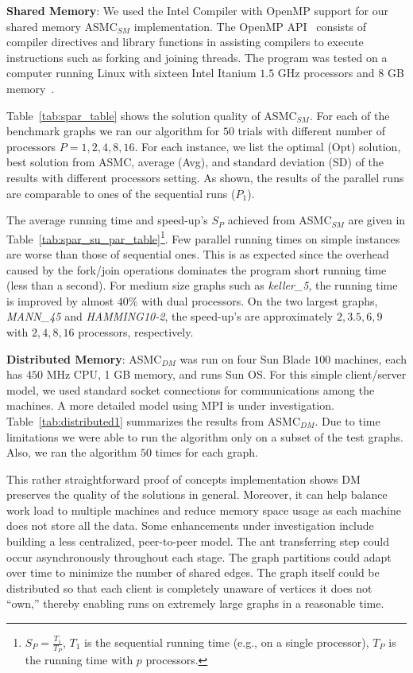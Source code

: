 \documentclass[11pt]{article}
\begin{document}
\textbf{Shared Memory}: We used the Intel Compiler with OpenMP support for our shared memory ASMC$_{SM}$ implementation. The OpenMP API~\cite{OpenMP} consists of compiler directives and library functions in assisting compilers to execute instructions such as forking and joining threads.  The program was tested on a computer running Linux with sixteen Intel Itanium $1.5$ GHz processors and $8$ GB memory~\cite{HPTestDrive}.


Table~\ref{tab:spar_table} shows the solution quality of ASMC$_{SM}$. For each of the benchmark graphs we ran our algorithm for $50$ trials with different number of processors $P=1,2,4,8,16$.  For each instance, we list the optimal (Opt) solution, best solution from ASMC, average (Avg), and standard deviation (SD) of the results with different processors setting.  As shown, the results of the parallel runs are comparable to ones of the sequential runs ($P_1$).

The average running time and speed-up's $S_P$ achieved from ASMC$_{SM}$ are given in Table~\ref{tab:spar_su_par_table}\footnote{$S_P = \frac{T_1}{T_P}$, $T_1$ is the sequential running time (e.g., on a single processor), $T_P$ is the running time with $p$ processors.}.  Few parallel running times on simple instances are worse than those of sequential ones. This is as expected since the overhead caused by the fork/join operations dominates the program short running time (less than a second). For medium size graphs such as \textit{keller\_5},  the running time is improved by almost $40\%$ with dual processors.  On the two largest graphs, \textit{MANN\_45} and \textit{HAMMING10-2}, the speed-up's are approximately $2, 3.5, 6, 9$ with $2,4,8,16$ processors, respectively.  %


\textbf{Distributed Memory}:  ASMC$_{DM}$ was run on four Sun Blade $100$ machines, each has $450$ MHz CPU, 1 GB memory, and runs Sun OS.  For this simple client/server model, we used standard socket connections for communications among the machines.  A more detailed model using MPI is under investigation.   Table~\ref{tab:distributed1} summarizes the results from ASMC$_{DM}$. Due to time limitations we were able to run the algorithm only on a subset of the test graphs.  Also, we ran the algorithm $50$ times for each graph.


This rather straightforward proof of concepts implementation shows DM preserves the quality of the solutions in general. Moreover, it can help  balance work load to multiple machines and reduce memory space usage as each machine does not store all the data. Some enhancements under investigation include building a less centralized, peer-to-peer model.  The ant transferring step could occur asynchronously throughout each stage. The graph partitions could adapt over time to minimize the number of shared edges.  The graph itself could be distributed so that each client is completely unaware of vertices it does not ``own,'' thereby enabling runs on extremely large graphs in a reasonable time.
\end{document}
